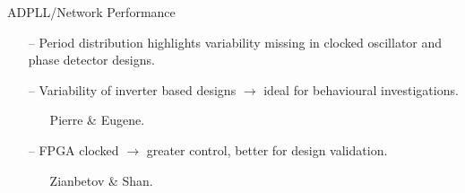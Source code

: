 \documentclass{beamer}
\begin{document}
\begin{frame}{ADPLL/Network Performance}
	\begin{itemize}
		\item[--]
			Period distribution highlights variability missing in clocked oscillator and phase detector designs.
		\item[--]
			Variability of inverter based designs $\rightarrow$ ideal for behavioural investigations.
			\begin{itemize}
				\item[]
					Pierre \& Eugene.
			\end{itemize} 
		\item[--]
			FPGA clocked $\rightarrow$ greater control, better for design validation.
			\begin{itemize}
				\item[]
					Zianbetov \& Shan.
			\end{itemize} 
			
	\end{itemize}
\end{frame}
\end{document}
